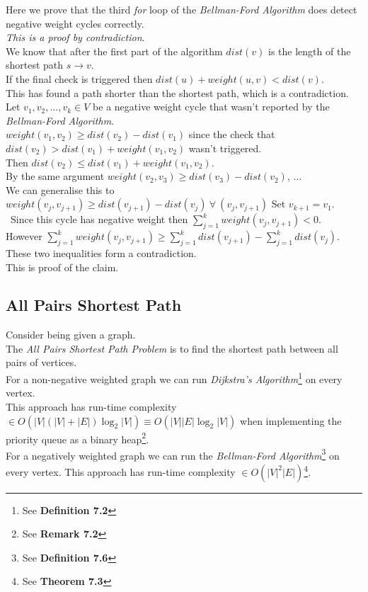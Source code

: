 \documentclass[11pt,a4paper]{article}
\begin{document}
Here we prove that the third \textit{for} loop of the \textit{Bellman-Ford Algorithm} does detect negative weight cycles correctly.\\
\textit{This is a proof by contradiction}.\\
We know that after the first part of the algorithm $dist(v)$ is the length of the shortest path $s\to v$.\\
If the final check is triggered then $dist(u)+weight(u,v)<dist(v)$.\\
This has found a path shorter than the shortest path, which is a contradiction.\\
Let $v_1,v_2,\dots,v_k\in V$ be a negative weight cycle that wasn't reported by the \textit{Bellman-Ford Algorithm}.\\
$weight(v_1,v_2)\geq dist(v_2)-dist(v_1)$ since the check that $dist(v_2)>dist(v_1)+weight(v_1,v_2)$ wasn't triggered.\\
Then $dist(v_2)\leq dist(v_1)+weight(v_1,v_2)$.\\
By the same argument $weight(v_2,v_3)\geq dist(v_3)-dist(v_2)$, $\dots$\\
We can generalise this to $weight(v_j,v_{j+1})\geq dist(v_{j+1})-dist(v_j)\ \forall\ (v_j,v_{j+1})$
Set $v_{k+1}=v_1$.\\\
Since this cycle has negative weight then $\sum_{j=1}^kweight(v_j,v_{j+1})<0$.\\
However $\sum_{j=1}^kweight(v_j,v_{j+1})\geq\sum_{j=1}^kdist(v_{j+1})-\sum_{j=1}^kdist(v_j)$.\\
These two inequalities form a contradiction.\\
This is proof of the claim.

\newpage
\subsection{All Pairs Shortest Path}

Consider being given a graph.\\
The \textit{All Pairs Shortest Path Problem} is to find the shortest path between all pairs of vertices.\\

For a non-negative weighted graph we can run \textit{Dijkstra's Algorithm}\footnote{See \textbf{Definition 7.2}} on every vertex.\\
This approach has run-time complexity $\in O(|V|(|V|+|E|)\log_2|V|)\equiv O(|V||E|\log_2|V|)$ when implementing the priority queue as a binary heap\footnote{See \textbf{Remark 7.2}}.\\
For a negatively weighted graph we can run the \textit{Bellman-Ford Algorithm}\footnote{See \textbf{Definition 7.6}} on every vertex.
This approach has run-time complexity $\in O(|V|^2|E|)$\footnote{See \textbf{Theorem 7.3}}.\\
\end{document}
